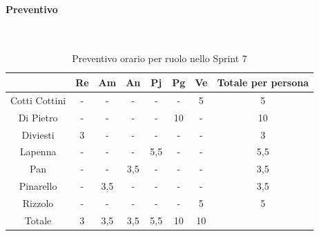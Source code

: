 \documentclass{article}
\begin{document}
                \paragraph{Preventivo}\mbox{}\\
                \begin{table}[H]
                    \centering
                    \begin{tabular}{|c|c|c|c|c|c|c|c|}
                    \hline
                                  & Re  & Am  & An  & Pj  & Pg  & Ve  & Totale per persona \\ \hline
                    Cotti Cottini & -   & -   & -   & -   & -   & 5   & 5                  \\ \hline
                    Di Pietro     & -   & -   & -   & -   & 10  & -   & 10                 \\ \hline
                    Diviesti      & 3   & -   & -   & -   & -   & -   & 3                  \\ \hline
                    Lapenna       & -   & -   & -   & 5,5 & -   & -   & 5,5                \\ \hline
                    Pan           & -   & -   & 3,5 & -   & -   & -   & 3,5                \\ \hline
                    Pinarello     & -   & 3,5 & -   & -   & -   & -   & 3,5                \\ \hline
                    Rizzolo       & -   & -   & -   & -   & -   & 5   & 5                  \\ \hline
                    Totale        & 3   & 3,5 & 3,5 & 5,5 & 10  & 10  &                    \\ \hline
                    \end{tabular}
                    \caption{Preventivo orario per ruolo nello Sprint 7}
                \end{table}

\end{document}

